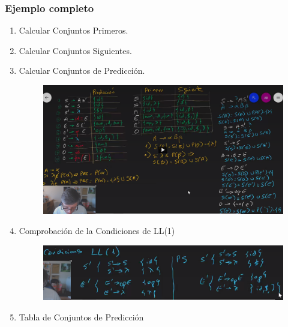 \documentclass[12pt]{report} %
\begin{document}
\newpage

\subsubsection{Ejemplo completo}

\begin{enumerate}
\def\labelenumi{\arabic{enumi}.}

\item
  Calcular Conjuntos Primeros.
\item
  Calcular Conjuntos Siguientes.
\item
  Calcular Conjuntos de Predicción.

\begin{figure}[H]
	{\includegraphics[scale=.12]{image-20210320110844879.png}}
\end{figure}

\item
  Comprobación de la Condiciones de
  LL(1)
  
  \begin{figure}[H]
	{\includegraphics[scale=.17]{image-20210320110940170.png}}
\end{figure}

\newpage
\item
  Tabla de Conjuntos de Predicción



\end{enumerate}
\end{document}
